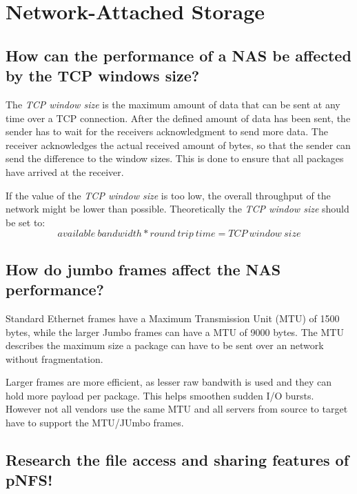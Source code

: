 \section{Network-Attached Storage} %
\label{sec:network_attached_storage}

\subsection{How can the performance of a NAS be affected by the TCP windows size?} %
\label{sub:how_can_the_performance_of_a_nas_be_affected_by_the_tcp_windows_size}
	The \emph{TCP window size} is the maximum amount of data
	that can be sent at any time over a TCP connection.
	After the defined amount of data has been sent,
	the sender has to wait for the receivers acknowledgment
	to send more data.
	The receiver acknowledges the actual received amount of bytes,
	so that the sender can send the difference to the window sizes.
	This is done to ensure that all packages have arrived at the receiver.

	If the value of the \emph{TCP window size} is too low,
	the overall throughput of the network might be lower than possible.
	Theoretically the \emph{TCP window size} should be set to:
	\begin{equation}
		available\ bandwidth * round\ trip\ time = TCP\ window\ size
	\end{equation}

\subsection{How do jumbo frames affect the NAS performance?} %
\label{sub:how_do_jumbo_frames_affect_the_nas_perfomance}
	Standard Ethernet frames have a Maximum Transmission Unit (MTU) of 1500 bytes,
	while the larger Jumbo frames can have a MTU of 9000 bytes.
	The MTU describes the maximum size a package can have
	to be sent over an network without fragmentation.

	Larger frames are more efficient,
	as lesser raw bandwith is used
	and they can hold more payload per package.
	This helps smoothen sudden I/O bursts.\\
	However not all vendors use the same MTU
	and all servers from source to target have to support the MTU/JUmbo frames.
\subsection{Research the file access and sharing features of pNFS!} %
\label{sub:research_the_file_access_and_sharing_features_of_pnfs}

